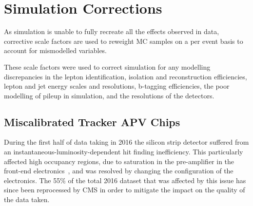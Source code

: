 %
%

\section{Simulation Corrections}\label{sec:simCorrections}
As simulation is unable to fully recreate all the effects observed in data, corrective scale factors are used to reweight MC samples on a per event basis to account for mismodelled variables.

These scale factors were used to correct simulation for any modelling discrepancies in the lepton identification, isolation and reconstruction efficiencies, lepton and jet energy scales and resolutions, b-tagging efficiencies, the poor modelling of pileup in simulation, and the resolutions of the detectors.

\subsection{Miscalibrated Tracker APV Chips}\label{subsec:hipEffect}
During the first half of data taking in 2016 the silicon strip detector suffered from an instantaneous-luminosity-dependent hit finding inefficiency.
This particularly affected high occupancy regions, due to saturation in the pre-amplifier in the front-end electronics~\cite{Fiori:2016ebh}, and was resolved by changing the configuration of the electronics.
The 55\% of the total 2016 dataset that was affected by this issue has since been reprocessed by CMS in order to mitigate the impact on the quality of the data taken.

